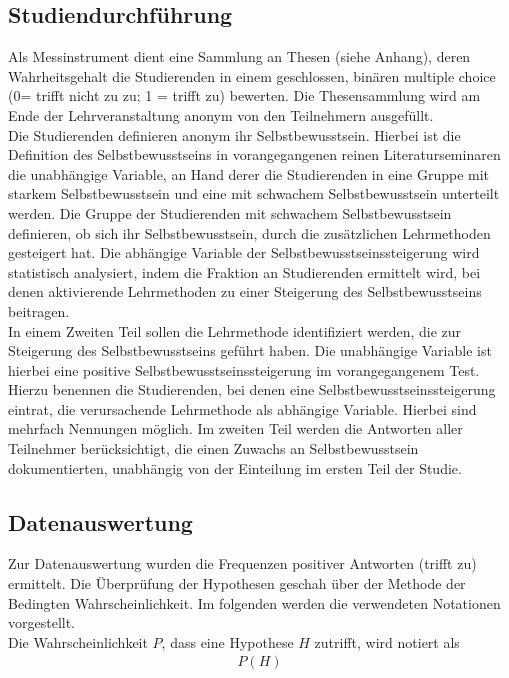 \subsection{Studiendurchführung}
Als Messinstrument dient eine Sammlung an Thesen (siehe Anhang), deren Wahrheitsgehalt die Studierenden in einem geschlossen, binären multiple choice (0= trifft nicht zu zu; 1 = trifft zu) bewerten. Die Thesensammlung wird am Ende der Lehrveranstaltung anonym von den Teilnehmern ausgefüllt.\\
\noindent
Die Studierenden definieren anonym ihr Selbstbewusstsein. Hierbei ist die Definition des Selbstbewusstseins in vorangegangenen reinen Literaturseminaren die unabhängige Variable, an Hand derer die Studierenden in eine Gruppe mit starkem Selbstbewusstsein und eine mit schwachem Selbstbewusstsein unterteilt werden. Die Gruppe der Studierenden mit schwachem Selbstbewusstsein definieren, ob sich ihr Selbstbewusstsein, durch die zusätzlichen Lehrmethoden gesteigert hat. Die abhängige Variable der Selbstbewusstseinssteigerung wird statistisch analysiert, indem die Fraktion an Studierenden ermittelt wird, bei denen aktivierende Lehrmethoden zu einer Steigerung des Selbstbewusstseins beitragen.\\
\noindent
In einem Zweiten Teil sollen die Lehrmethode identifiziert werden, die zur Steigerung des Selbstbewusstseins geführt haben. Die unabhängige Variable ist hierbei eine positive Selbstbewusstseinssteigerung im vorangegangenem Test. Hierzu benennen die Studierenden, bei denen eine Selbstbewusstseinssteigerung eintrat, die verursachende Lehrmethode als abhängige Variable. Hierbei sind mehrfach Nennungen möglich. Im zweiten Teil werden die Antworten aller Teilnehmer berücksichtigt, die einen Zuwachs an Selbstbewusstsein dokumentierten, unabhängig von der Einteilung im ersten Teil der Studie.

\subsection{Datenauswertung}
Zur Datenauswertung wurden die Frequenzen positiver Antworten (trifft zu) ermittelt. Die Überprüfung der Hypothesen geschah über der Methode der Bedingten Wahrscheinlichkeit. Im folgenden werden die verwendeten Notationen vorgestellt.\\
\noindent
Die Wahrscheinlichkeit $P$, dass eine Hypothese $H$ zutrifft, wird notiert als
\begin{align}
	\label{eq:Prob1}
	P(H)
\end{align}

